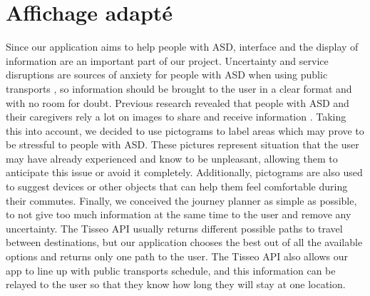 \section{Affichage adapté}

Since our application aims to help people with ASD, interface and the display of information are an important part of our project. Uncertainty and service disruptions are sources of anxiety for people with ASD when using public transports \cite{2020ExperiencesYoungAutistic}, so information should be brought to the user in a clear format and with no room for doubt.
\newline
Previous research revealed that people with ASD and their caregivers rely a lot on images to share and receive information \cite{2018MobilityPoliciesExtraSmall}. Taking this into account, we decided to use pictograms to label areas which may prove to be stressful to people with ASD. These pictures represent situation that the user may have already experienced and know to be unpleasant, allowing them to anticipate this issue or avoid it completely. Additionally, pictograms are also used to suggest devices or other objects that can help them feel comfortable during their commutes. 
\newline 
Finally, we conceived the journey planner as simple as possible, to not give too much information at the same time to the user and remove any uncertainty. The Tisseo API usually returns different possible paths to travel between destinations, but our application chooses the best out of all the available options and returns only one path to the user. The Tisseo API also allows our app to line up with public transports schedule, and this information can be relayed to the user so that they know how long they will stay at one location.